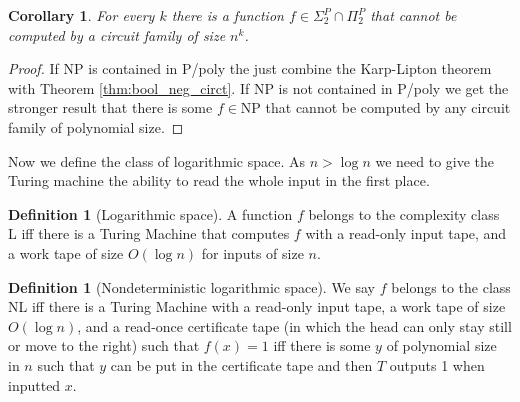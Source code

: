 \documentclass{report}
\theoremstyle{definition}
\theoremstyle{plain}
\newtheorem{coro}[thm]{Corollary}
\theoremstyle{definition}
\newtheorem{defn}[thm]{Definition}
\begin{document}
	\begin{coro}
		For every $k$ there is a function $f\in\Sigma_2^P\cap \Pi_2^P$ that cannot be computed by a circuit family of size $n^k$.
	\end{coro}
	\begin{proof}
		If NP is contained in P/poly the just combine the Karp-Lipton theorem with Theorem \ref{thm:bool_neg_circt}. If NP is not contained in P/poly we get the stronger result that there is some $f\in\text{NP}$ that cannot be computed by any circuit family of polynomial size.
	\end{proof}
	Now we define the class of logarithmic space. As $n>\log n$ we need to give the Turing machine the ability to read the whole input in the first place.
	\begin{defn}[Logarithmic space]
		A function $f$ belongs to the complexity class L iff there is a Turing Machine that computes $f$ with a read-only input tape, and a work tape of size $O(\log n)$ for inputs of size $n$.
	\end{defn}
	\begin{defn}[Nondeterministic logarithmic space]
		We say $f$ belongs to the class NL iff there is a Turing Machine with a read-only input tape, a work tape of size $O(\log n)$, and a read-once certificate tape (in which the head can only stay still or move to the right) such that $f(x)=1$ iff there is some $y$ of polynomial size in $n$ such that $y$ can be put in the certificate tape and then $T$ outputs 1 when inputted $x$.
	\end{defn}
\end{document}
